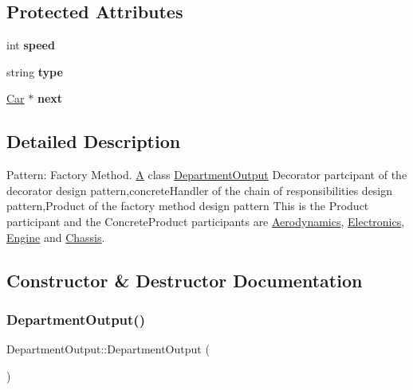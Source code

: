 \subsection*{Protected Attributes}
\begin{DoxyCompactItemize}
\item 
\mbox{\label{classDepartmentOutput_a80415966e2307bbd8b7d6ec53a709ab7}} 
int {\bfseries speed}
\item 
\mbox{\label{classDepartmentOutput_a1f82ab864fefab53c1c72707a4de6a99}} 
string {\bfseries type}
\item 
\mbox{\label{classDepartmentOutput_a4bf4b9dd4707658be9f0573f493ec296}} 
\hyperlink{classCar}{Car} $\ast$ {\bfseries next}
\end{DoxyCompactItemize}


\subsection{Detailed Description}
Pattern\+: Factory Method. \hyperlink{classA}{A} class \hyperlink{classDepartmentOutput}{Department\+Output} Decorator partcipant of the decorator design pattern,concrete\+Handler of the chain of responsibilities design pattern,Product of the factory method design pattern This is the Product participant and the Concrete\+Product participants are \hyperlink{classAerodynamics}{Aerodynamics}, \hyperlink{classElectronics}{Electronics}, \hyperlink{classEngine}{Engine} and \hyperlink{classChassis}{Chassis}. 

\subsection{Constructor \& Destructor Documentation}
\mbox{\label{classDepartmentOutput_af48d2aeafaead9c3f77c506112d80ca8}} 
\subsubsection{\texorpdfstring{Department\+Output()}{DepartmentOutput()}}
{\footnotesize\ttfamily Department\+Output\+::\+Department\+Output (\begin{DoxyParamCaption}{ }\end{DoxyParamCaption})}

